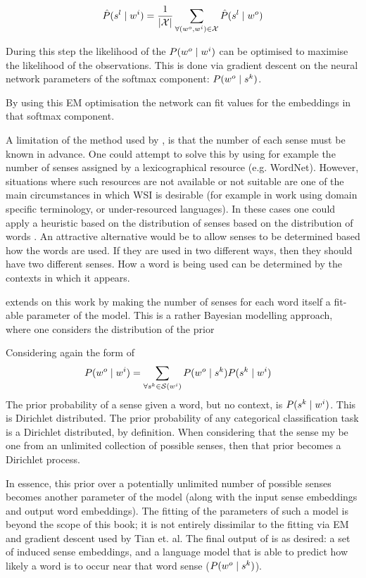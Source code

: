 \documentclass[12pt,parskip]{komatufte}
\begin{document}
\begin{align}
\hat{P}(\n s_l \mid \n w_i) = \frac{1}{\left|\seq X\right|} \sum_{\forall (\n w_o,\n w_i)\in \seq X} \hat{P}(\n s_l \mid \n w_o)
\end{align}

During this step the likelihood of the $P(\n w_o \mid \n w_i)$ can be optimised to maximise the likelihood of the observations.
This is done via gradient descent on the neural network parameters of the softmax component: $P(\n w_o \mid \n s_k)$.

By using this EM optimisation the network can fit values for the embeddings in that softmax component.


A limitation of the method used by , is that the number of each sense must be known in advance.
One could attempt to solve this by using for example the number of senses assigned by a lexicographical resource (e.g. WordNet).
However, situations where such resources are not available or not suitable are one of the main circumstances in which WSI is desirable  (for example in work using domain specific terminology, or under-resourced languages).
In these cases one could apply a heuristic based on the distribution of senses based on the distribution of words \parencite{zipf1945meaning}.
An attractive alternative would be to allow senses to be determined based how the words are used. If they are used in two different ways, then they should have two different senses.
How a word is being used can be determined by the contexts in which it appears.


 extends on this work by making the number of senses for each word itself a fit-able parameter of the model.
This is a rather Bayesian modelling approach, where one considers the distribution of the prior

Considering again the form of 
\begin{align}
P(\n w_o\mid \n w_i) &= \sum_{\forall \n s_k \in \seq S(\n w_i)} P(\n w_o \mid \n s_k) P(\n s_k \mid \n w_i) 
\end{align}
The prior probability of a sense given a word, but no context, is 
$P(\n s_k \mid \n w_i)$.
This is Dirichlet distributed.
The prior probability of any categorical classification task is a Dirichlet distributed, by  definition.
When considering that the sense my be one from an unlimited collection of possible senses,
then that prior becomes a Dirichlet process.

In essence, this prior over a potentially unlimited number of possible senses becomes another parameter of the model (along with the input sense embeddings and output word embeddings).
The fitting of the parameters of such a model is beyond the scope of this book;
it is not entirely dissimilar to the fitting via EM and gradient descent used by Tian et. al.
The final output of  is as desired:
a set of induced sense embeddings, 
and a language model that is able to predict how likely a word is to occur near that word sense ($P(\n w_o \mid \n s_k)$).
\end{document}
